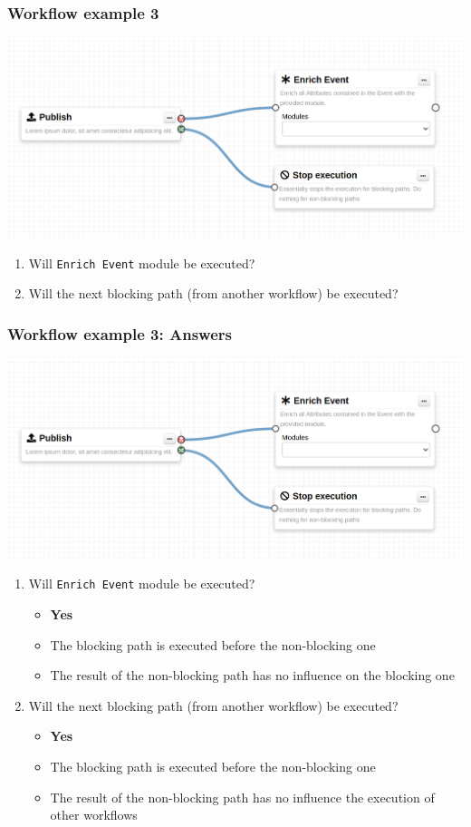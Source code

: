 \begin{frame}
    \frametitle{Workflow example 3}
    \begin{center}
        \includegraphics[width=0.9\linewidth]{pictures/example-3.png}
    \end{center}

    \begin{enumerate}
        \item Will \texttt{Enrich Event} module be executed?
        \item Will the next blocking path (from another workflow) be executed?
    \end{enumerate}
\end{frame}

\begin{frame}
    \frametitle{Workflow example 3: Answers}
    \begin{center}
        \includegraphics[width=0.55\linewidth]{pictures/example-3.png}
    \end{center}

    \begin{enumerate}
        \item Will \texttt{Enrich Event} module be executed?
        \begin{itemize}
            \item \textbf{Yes}
            \item The blocking path is executed before the non-blocking one
            \item The result of the non-blocking path has no influence on the blocking one
        \end{itemize}
        \item Will the next blocking path (from another workflow) be executed?
        \begin{itemize}
            \item \textbf{Yes}
            \item The blocking path is executed before the non-blocking one
            \item The result of the non-blocking path has no influence the execution of other workflows
        \end{itemize}
    \end{enumerate}
\end{frame}

